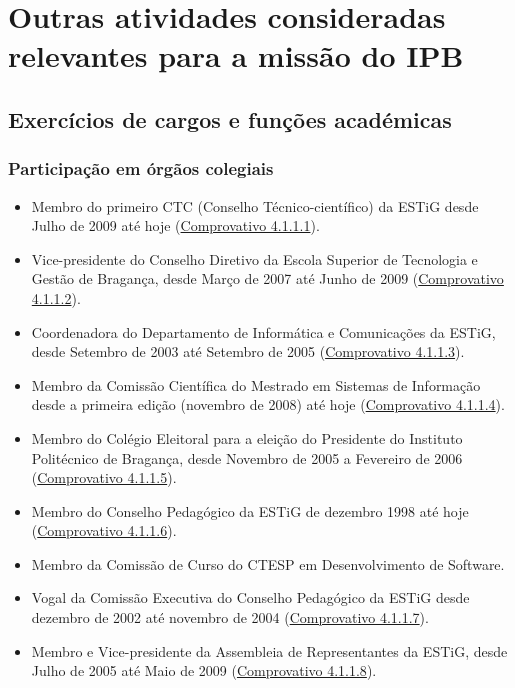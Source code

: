 \documentclass[11pt]{article}
\begin{document}
\section{Outras atividades consideradas relevantes para a missão do IPB}

\subsection{Exercícios de cargos e funções académicas}
\subsubsection{Participação em órgãos colegiais}
\begin{itemize}
\item {Membro do primeiro CTC (Conselho Técnico-científico) da ESTiG desde Julho de 2009 até hoje (\href{run:MissaoIPBCargos/ctc.pdf}{Comprovativo 4.1.1.1}). }
\item {Vice-presidente do Conselho Diretivo da Escola Superior de Tecnologia e Gestão de Bragança, desde Março de 2007 até Junho de 2009 (\href{run:MissaoIPBCargos/subdiretora.pdf}{Comprovativo 4.1.1.2}).}
\item {Coordenadora do Departamento de Informática e Comunicações da ESTiG, desde Setembro de 2003 até Setembro de 2005 (\href{run:MissaoIPBCargos/coordDIC.pdf}{Comprovativo 4.1.1.3}).}
\item {Membro da Comissão Científica do Mestrado em Sistemas de Informação desde a primeira edição (novembro de 2008) até hoje (\href{run:MissaoIPBCargos/msi.pdf}{Comprovativo 4.1.1.4}).}
\item {Membro do Colégio Eleitoral para a eleição do Presidente do Instituto Politécnico de Bragança, desde Novembro de 2005 a Fevereiro de 2006 (\href{run:MissaoIPBCargos/colegioeleitoral.pdf}{Comprovativo 4.1.1.5}).}
\item {Membro do Conselho Pedagógico da ESTiG de dezembro 1998 até hoje (\href{run:MissaoIPBCargos/CP.pdf}{Comprovativo 4.1.1.6}).  }
\item {Membro da Comissão de Curso do CTESP em Desenvolvimento de Software.}
\item {Vogal da Comissão Executiva do Conselho Pedagógico da ESTiG desde dezembro de 2002 até novembro de 2004 (\href{run:MissaoIPBCargos/CP.pdf}{Comprovativo 4.1.1.7}).}
\item {Membro e Vice-presidente da Assembleia de Representantes da ESTiG, desde Julho de 2005 até Maio de 2009 (\href{run:MissaoIPBCargos/AssembleiaRepresentantes.pdf}{Comprovativo 4.1.1.8}).}

\end{itemize}
\end{document}
